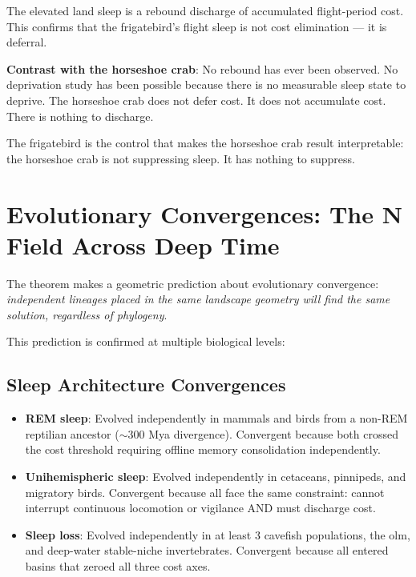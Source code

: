 \documentclass[12pt, a4paper]{article}
\begin{document}
The elevated land sleep is a rebound discharge of accumulated
flight-period cost. This confirms that the frigatebird's
flight sleep is not cost elimination --- it is deferral.

\textbf{Contrast with the horseshoe crab}: No rebound has
ever been observed. No deprivation study has been possible
because there is no measurable sleep state to deprive.
The horseshoe crab does not defer cost. It does not
accumulate cost. There is nothing to discharge.

The frigatebird is the control that makes the horseshoe crab
result interpretable: the horseshoe crab is not suppressing
sleep. It has nothing to suppress.

\section{Evolutionary Convergences: The N Field Across Deep Time}
\label{sec:convergences}

The theorem makes a geometric prediction about evolutionary
convergence: \textit{independent lineages placed in the same
landscape geometry will find the same solution, regardless
of phylogeny}.

This prediction is confirmed at multiple biological levels:

\subsection{Sleep Architecture Convergences}

\begin{itemize}
    \item \textbf{REM sleep}: Evolved independently in
          mammals and birds from a non-REM reptilian
          ancestor ($\sim$300 Mya divergence). Convergent
          because both crossed the cost threshold requiring
          offline memory consolidation independently.
    \item \textbf{Unihemispheric sleep}: Evolved
          independently in cetaceans, pinnipeds, and
          migratory birds. Convergent because all face the
          same constraint: cannot interrupt continuous
          locomotion or vigilance AND must discharge cost.
    \item \textbf{Sleep loss}: Evolved independently in at
          least 3 cavefish populations, the olm, and
          deep-water stable-niche invertebrates. Convergent
          because all entered basins that zeroed all three
          cost axes.
\end{itemize}
\end{document}
